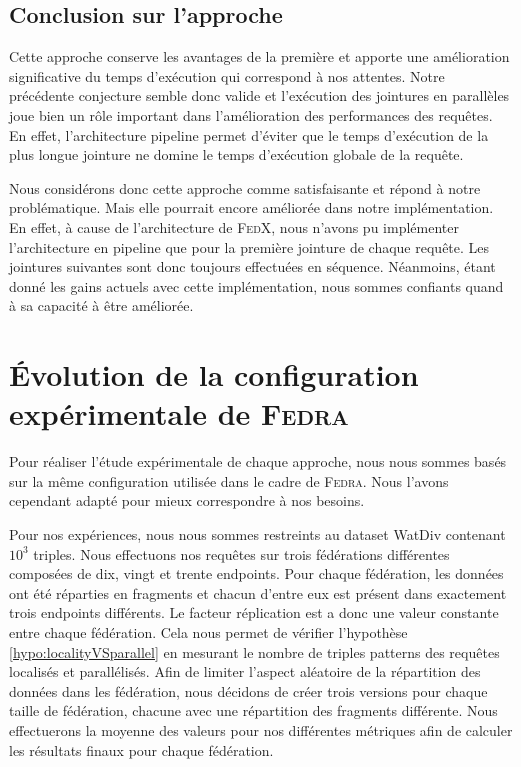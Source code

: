\documentclass[a4paper]{article}
\def\fedra{\textsc{Fedra}\xspace}
\def\fedx{\textsc{FedX}\xspace}
\begin{document}
\subsection{Conclusion sur l'approche}

Cette approche conserve les avantages de la première et apporte une amélioration significative du temps d'exécution qui correspond à nos attentes. Notre précédente conjecture semble donc valide et l'exécution des jointures en parallèles joue bien un rôle important dans l'amélioration des performances des requêtes. En effet, l'architecture pipeline permet d'éviter que le temps d'exécution de la plus longue jointure ne domine le temps d'exécution globale de la requête.

Nous considérons donc cette approche comme satisfaisante et répond à notre problématique. Mais elle pourrait encore améliorée dans notre implémentation. En effet, à cause de l'architecture de \fedx, nous n'avons pu implémenter l'architecture en pipeline que pour la première jointure de chaque requête. Les jointures suivantes sont donc toujours effectuées en séquence. Néanmoins, étant donné les gains actuels avec cette implémentation, nous sommes confiants quand à sa capacité à être améliorée.

\section{Évolution de la configuration expérimentale de \fedra}\label{sec:setup}

Pour réaliser l'étude expérimentale de chaque approche, nous nous sommes basés sur la même configuration utilisée dans le cadre de \fedra \cite{montoya2014fedra}. Nous l'avons cependant adapté pour mieux correspondre à nos besoins.

Pour nos expériences, nous nous sommes restreints au dataset WatDiv contenant $10^3$ triples. Nous effectuons nos requêtes sur trois fédérations différentes composées de dix, vingt et trente endpoints. Pour chaque fédération, les données ont été réparties en fragments et chacun d'entre eux est présent dans exactement trois endpoints différents. Le facteur réplication est a donc une valeur constante entre chaque fédération. Cela nous permet de vérifier l'hypothèse \ref{hypo:localityVSparallel} en mesurant le nombre de triples patterns des requêtes localisés et parallélisés. Afin de limiter l'aspect aléatoire de la répartition des données dans les fédération, nous décidons de créer trois versions pour chaque taille de fédération, chacune avec une répartition des fragments différente. Nous effectuerons la moyenne des valeurs pour nos différentes métriques afin de calculer les résultats finaux pour chaque fédération.
\end{document}
